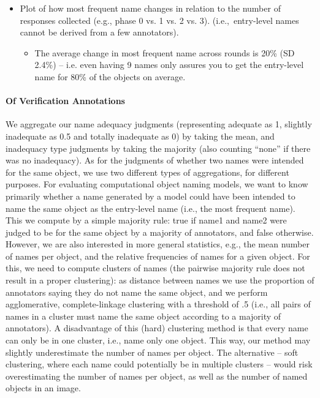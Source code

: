 \begin{itemize}
	\item Plot of how most frequent name changes in relation to the number of responses collected (e.g., phase 0 vs. 1 vs. 2 vs. 3). (i.e.,\ entry-level names cannot be derived from a few annotators). 
          \begin{itemize}
          \item The average change in most frequent name across rounds is 20\% (SD 2.4\%) -- i.e. even having 9 names only assures you to get the entry-level name for 80\% of the objects on average. 
          \end{itemize}
	
\end{itemize}


\paragraph{Of Verification Annotations}

We aggregate our name adequacy judgments (representing adequate as 1, slightly inadequate as 0.5 and totally inadequate as 0) by taking the mean, and inadequacy type judgments by taking the majority (also counting ``none'' if there was no inadequacy).
As for the judgments of whether two names were intended for the same object, we use two different types of aggregations, for different purposes.
For evaluating computational object naming models, we want to know primarily whether a name generated by a model could have been intended to name the same object as the entry-level name (i.e., the most frequent name).
This we compute by a simple majority rule: true if name1 and name2 were judged to be for the same object by a majority of annotators, and false otherwise.
However, we are also interested in more general statistics, e.g., the mean number of names per object, and the relative frequencies of names for a given object.
For this, we need to compute clusters of names  (the pairwise majority rule does not result in a proper clustering): as distance between names we use the proportion of annotators saying they do not name the same object, and we perform agglomerative, complete-linkage clustering with a threshold of .5 (i.e., all pairs of names in a cluster must name the same object according to a majority of annotators).
A disadvantage of this (hard) clustering method is that every name can only be in one cluster, i.e., name only one object. 
This way, our method may slightly underestimate the number of names per object.
The alternative -- soft clustering, where each name could potentially be in multiple clusters -- would risk overestimating the number of names per object, as well as the number of named objects in an image.


